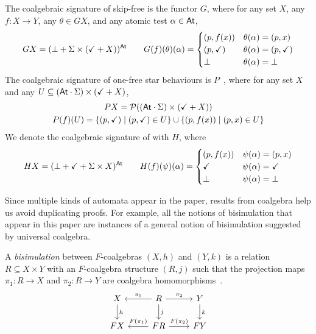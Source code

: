\documentclass[orivec,envcountsect,envcountsame]{llncs}
\begin{document}
\begin{example}\label{tab:coalgebraic signatures}
	The coalgebraic signature of skip-free \GKAT is the functor \(G\), where for any set \(X\), any \(f : X \to Y\), any \(\theta \in GX\), and any atomic test \(\alpha \in \mathsf{At}\),
	\begin{gather*}
		GX = (\bot + \Sigma\times(\checkmark + X))^{\mathsf{At}}
		\qquad
		G(f)(\theta)(\alpha) = \begin{cases}
			(p, f(x)) & \theta(\alpha) = (p, x) \\
			(p, \checkmark) &\theta(\alpha) = (p, \checkmark) \\
			\bot &\theta(\alpha) = \bot
		\end{cases}
	\end{gather*}
	The coalgebraic signature of one-free star behaviours is \(P\)~\cite{starmfps}, where for any set \(X\) and any \(U \subseteq (\mathsf{At} \cdot \Sigma) \times (\checkmark + X)\),
	\begin{gather*}
		PX = \mathcal P((\mathsf{At} \cdot \Sigma)\times(\checkmark + X))
		\\
		P(f)(U) = \{(p, \checkmark) \mid (p, \checkmark) \in U\} \cup \{(p, f(x)) \mid (p, x) \in U\}
	\end{gather*}
	We denote the coalgebraic signature of \GKAT with \(H\), where
	\begin{gather*}
		HX = (\bot + \checkmark + \Sigma\times X)^{\mathsf{At}}
		\qquad
		H(f)(\psi)(\alpha) = \begin{cases}
			(p, f(x)) & \psi(\alpha) = (p, x) \\
			\checkmark &\psi(\alpha) = \checkmark \\
			\bot &\psi(\alpha) = \bot
		\end{cases}
	\end{gather*}
\end{example}

Since multiple kinds of automata appear in the paper, results from coalgebra help us avoid duplicating proofs.
For example, all the notions of bisimulation that appear in this paper are instances of a general notion of bisimulation suggested by universal coalgebra.

\begin{definition}\label{def:general bisim}
	A \emph{bisimulation} between \(F\)-coalgebras \((X, h)\) and \((Y, k)\) is a relation \(R \subseteq X \times Y\) with an \(F\)-coalgebra structure \((R, j)\) such that the projection maps \(\pi_1 : R \to X\) and \(\pi_2 : R \to Y\) are coalgebra homomorphisms~\cite{coalgebra}.
	\[\begin{tikzcd}
		X \ar[d, "h"]
		& R \ar[d, "j"] \ar[l, "{\pi_1}"'] \ar[r, "{\pi_2}"]
		& Y \ar[d,"k"] \\
		FX
		& FR \ar[l, "{F(\pi_1)}"'] \ar[r, "{F(\pi_2)}"]
		& FY
	\end{tikzcd}
	\]
\end{definition}
\end{document}
